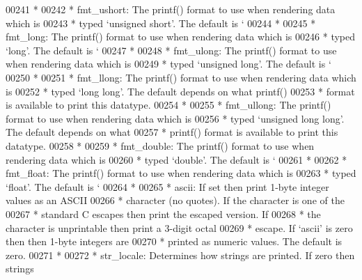 \begin{DoxyCode}
{{{{{{{00241 \textcolor{comment}{     *}
00242 \textcolor{comment}{     *   fmt\_ushort: The printf() format to use when rendering data which is}
00243 \textcolor{comment}{     *               typed `unsigned short'. The default is `%
00244 \textcolor{comment}{     *}
00245 \textcolor{comment}{     *   fmt\_long:   The printf() format to use when rendering data which is}
00246 \textcolor{comment}{     *               typed `long'. The default is `%
00247 \textcolor{comment}{     *}
00248 \textcolor{comment}{     *   fmt\_ulong:  The printf() format to use when rendering data which is}
00249 \textcolor{comment}{     *               typed `unsigned long'. The default is `%
00250 \textcolor{comment}{     *}
00251 \textcolor{comment}{     *   fmt\_llong:  The printf() format to use when rendering data which is}
00252 \textcolor{comment}{     *               typed `long long'. The default depends on what printf()}
00253 \textcolor{comment}{     *               format is available to print this datatype.}
00254 \textcolor{comment}{     *}
00255 \textcolor{comment}{     *   fmt\_ullong: The printf() format to use when rendering data which is}
00256 \textcolor{comment}{     *               typed `unsigned long long'. The default depends on what}
00257 \textcolor{comment}{     *               printf() format is available to print this datatype.}
00258 \textcolor{comment}{     *}
00259 \textcolor{comment}{     *   fmt\_double: The printf() format to use when rendering data which is}
00260 \textcolor{comment}{     *               typed `double'. The default is `%
00261 \textcolor{comment}{     *}
00262 \textcolor{comment}{     *   fmt\_float:  The printf() format to use when rendering data which is}
00263 \textcolor{comment}{     *               typed `float'. The default is `%
00264 \textcolor{comment}{     *}
00265 \textcolor{comment}{     *   ascii:      If set then print 1-byte integer values as an ASCII}
00266 \textcolor{comment}{     *               character (no quotes).  If the character is one of the}
00267 \textcolor{comment}{     *               standard C escapes then print the escaped version.  If}
00268 \textcolor{comment}{     *               the character is unprintable then print a 3-digit octal}
00269 \textcolor{comment}{     *               escape.  If `ascii' is zero then then 1-byte integers are}
00270 \textcolor{comment}{     *               printed as numeric values.  The default is zero.}
00271 \textcolor{comment}{     *}
00272 \textcolor{comment}{     *   str\_locale: Determines how strings are printed. If zero then strings}
}}}}}}}}}}}}
\end{DoxyCode}
